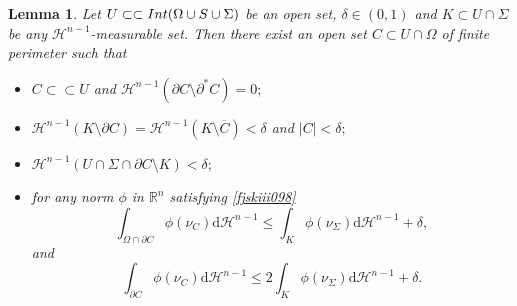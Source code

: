 \documentclass[reqno]{amsart}
\numberwithin{equation}{section}
\theoremstyle{plain}
\newtheorem{lemma}[theorem]{Lemma}
\theoremstyle{definition}
\newcommand{\R}{\mathbb{R}}
\newcommand{\cH}{\mathcal{H}}
\newcommand{\p}{\partial}
\newcommand{\cl}[1]{\overline{#1}}
\renewcommand{\d}{\mathrm{d}}
\newcommand{\strictlyincluded}{\subset\subset}
\newcommand{\substrate}{S}
\newcommand{\Ins}[1]{{\rm Int}{(#1\cup \substrate\cup \Sigma)}}
\begin{document}
\begin{lemma}\label{lem:holes_near_Sigma}
Let $U\strictlyincluded \Ins{\Omega}$ be an open set, $\delta\in(0,1)$ and  $K\subset U\cap\Sigma$ be any $\cH^{n-1}$-measurable set. Then there exist an open set $C\subset U\cap \Omega$ of finite perimeter such that 
\begin{itemize}[left=15pt]
 \item[\rm(i)] $C\strictlyincluded U$ and $\cH^{n-1}(\p C\setminus \p^*C)=0;$
 
 \item[\rm(ii)] $\cH^{n-1}(K\setminus \p C)=\cH^{n-1}(K\setminus \cl{C})<\delta$ and $|C|<\delta;$
 
 \item[\rm(iii)] $\cH^{n-1}(U\cap \Sigma \cap\p C \setminus K)<\delta;$
 
 \item[\rm(iv)] for any norm $\phi$ in $\R^n$ satisfying \eqref{fjskiii098}
 $$
 \int_{\Omega\cap \p C} \phi(\nu_C)\d\cH^{n-1} \le \int_K\phi(\nu_\Sigma) \d\cH^{n-1} +\delta, 
 $$
 and 
 $$
 \int_{\p C} \phi(\nu_C)\d\cH^{n-1} \le 2\int_K\phi(\nu_\Sigma) \d\cH^{n-1} +\delta .
 $$ 
\end{itemize}
\end{lemma}
\end{document}
